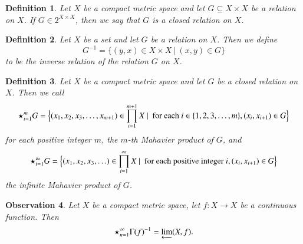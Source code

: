 \documentclass[a4paper,12pt]{article} %
\newtheorem{theorem}{Theorem}[section]
\newtheorem{definition}[theorem]{Definition}
\newtheorem{observation}[theorem]{Observation}
\begin{document}
%

\begin{definition}
Let $X$ be a compact metric space and let $G\subseteq X\times X$ be a relation on $X$. If $G\in 2^{X\times X}$, then we say that $G$ is \emph{ \color{blue} a closed relation on $X$}.  
\end{definition}

\begin{definition}
Let $X$  be a set and let $G$ be a relation on $X$.  Then we define  
$$
G^{-1}=\{(y,x)\in X\times X \ | \ (x,y)\in G\}
$$
to be \emph{ \color{blue} the inverse relation of the relation $G$} on $X$.
\end{definition}
\begin{definition}
Let $X$ be a compact metric space and let $G$ be a closed relation on $X$. Then we call
$$
\star_{i=1}^{m}G=\Big\{(x_1,x_2,x_3,\ldots ,x_{m+1})\in \prod_{i=1}^{m+1}X \ | \ \textup{ for each } i\in \{1,2,3,\ldots ,m\}, (x_{i},x_{i+1})\in G\Big\}
$$
for each positive integer $m$, \emph{ \color{blue} the $m$-th Mahavier product of $G$}, and
$$
\star_{i=1}^{\infty}G=\Big\{(x_1,x_2,x_3,\ldots )\in \prod_{i=1}^{\infty}X \ | \ \textup{ for each positive integer } i, (x_{i},x_{i+1})\in G\Big\}
$$
\emph{ \color{blue} the infinite  Mahavier product of $G$}.
\end{definition}
\begin{observation}
Let $X$ be a compact metric space, let $f:X\rightarrow X$ be a continuous function. 
Then 
$$
\star_{n=1}^{\infty}\Gamma(f)^{-1}=\varprojlim(X,f).
$$
\end{observation}
\end{document}
